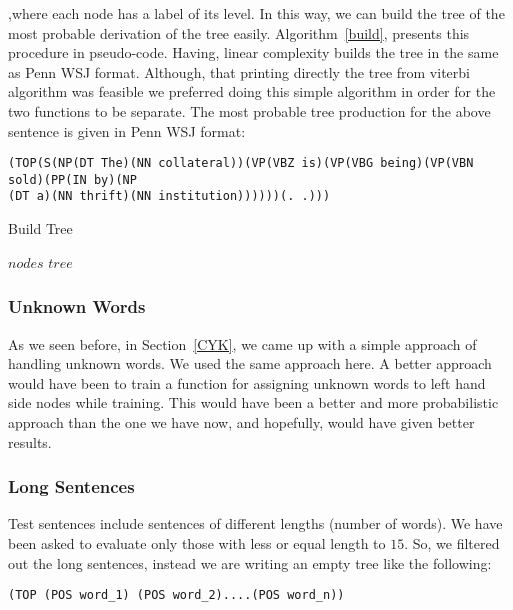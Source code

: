 \documentclass[a4paper,11pt]{article}
\begin{document}
,where each node has a label of its level. In this way, we can build the tree of the most probable derivation of the tree easily. Algorithm~\ref{build}, presents this procedure in pseudo-code. Having, linear complexity builds the tree in the same as Penn WSJ format. Although, that printing directly the tree from viterbi algorithm was feasible we preferred doing this simple algorithm in order for the two functions to be separate. The most probable tree production for the above sentence is given in Penn WSJ format:
\begin{verbatim}
(TOP(S(NP(DT The)(NN collateral))(VP(VBZ is)(VP(VBG being)(VP(VBN sold)(PP(IN by)(NP
(DT a)(NN thrift)(NN institution))))))(. .)))
\end{verbatim}


\begin{algorithm}[t!]
\caption{Build Tree}
\label{build}
\begin{scriptsize}
\begin{algorithmic}[1]
 $nodes$
 $tree$
\ELSE
{}
\ENDIF
{}
\ELSE
{}
\ENDIF
\ENDWHILE
{}
\ENDFOR
\end{algorithmic}
\end{scriptsize}
\end{algorithm}

\subsubsection{Unknown Words}
As we seen before, in Section~\ref{CYK}, we came up with a simple approach of handling unknown words. We used the same approach here. A better approach would have been to train a function for assigning unknown words to left hand side nodes while training. This would have been a better and more probabilistic approach than the one we have now, and hopefully, would have given better results. 

\subsubsection{Long Sentences}
Test sentences include sentences of different lengths (number of words). We have been asked to evaluate only those with less or equal length to $15$. So, we filtered out the long sentences, instead we are writing an empty tree like the following:
\begin{verbatim}
(TOP (POS word_1) (POS word_2)....(POS word_n)) 
\end{verbatim}
\end{document}

